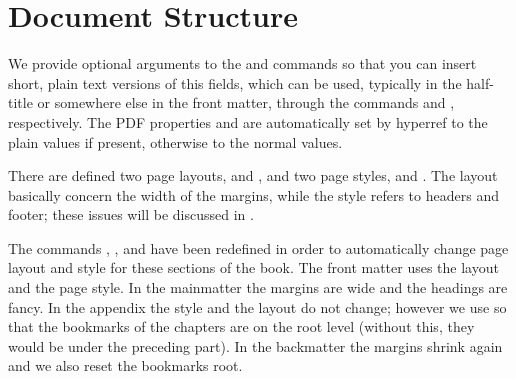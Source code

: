\section{Document Structure}

We provide optional arguments to the  and
 commands so that you can insert short, plain text
versions of this fields, which can be used, typically in the half-title
or somewhere else in the front matter, through the commands
 and , respectively. The PDF
properties  and  are automatically
set by hyperref to the plain values if present, otherwise to the normal
values.

There are defined two page layouts,  and ,
and two page styles,  and . The layout
basically concern the width of the margins, while the style refers to
headers and footer; these issues will be
discussed in .

The commands , , and
 have been redefined in order to automatically
change page layout and style for these sections of the book. The front
matter uses the  layout and the  page
style. In the mainmatter the margins are wide and the headings are
fancy. In the appendix the style and the layout do not change; however
we use  so that the bookmarks of
the chapters are on the root level (without this, they would be under
the preceding part). In the backmatter the margins shrink again and we
also reset the bookmarks root.
